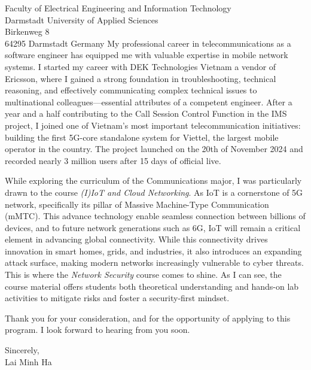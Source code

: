 \documentclass[a4paper,11pt]{letter}
\begin{document}
\begin{letter}{
    Faculty of Electrical Engineering and Information Technology
    \\ Darmstadt University of Applied Sciences
    \\ Birkenweg 8
    \\ 64295 Darmstadt Germany
}
My professional career in telecommunications as a software engineer has equipped me with valuable expertise in mobile network systems. I started my career with DEK Technologies Vietnam a vendor of Ericsson, where I gained a strong foundation in troubleshooting, technical reasoning, and effectively communicating complex technical issues to multinational colleagues—essential attributes of a competent engineer. After a year and a half contributing to the Call Session Control Function in the IMS project, I joined one of Vietnam's most important telecommunication initiatives: building the first 5G-core standalone system for Viettel, the largest mobile operator in the country. The project launched on the 20th of November 2024 and recorded nearly 3 million users after 15 days of official live.

While exploring the curriculum of the Communications major, I was particularly drawn to the course \textit{(I)IoT and Cloud Networking}. As IoT is a cornerstone of 5G network, specifically its pillar of Massive Machine-Type Communication (mMTC). This advance technology enable seamless connection between billions of devices, and to future network generations such as 6G, IoT will remain a critical element in advancing global connectivity. While this connectivity drives innovation in smart homes, grids, and industries, it also introduces an expanding attack surface, making modern networks increasingly vulnerable to cyber threats. This is where the \textit{Network Security} course comes to shine. As I can see, the course material offers students both theoretical understanding and hands-on lab activities to mitigate risks and foster a security-first mindset.

Thank you for your consideration, and for the opportunity of applying to this program. I look forward to hearing from you soon.

\begin{flushright}
    Sincerely,
    \\ Lai Minh Ha
\end{flushright}

\end{letter}
\end{document}
